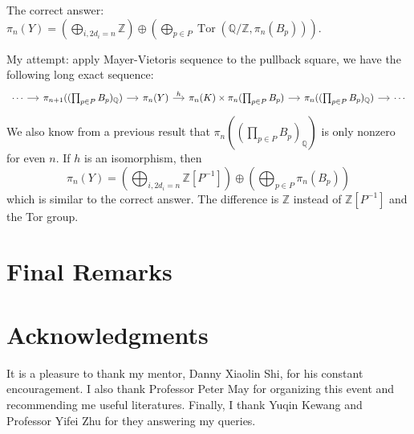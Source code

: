 \documentclass[psamsfonts]{amsart}
\theoremstyle{definition}
\newcommand{\Q}{\mathbb{Q}}
\newcommand{\Z}{\mathbb{Z}}
\DeclareMathOperator{\Tor}{Tor}
\numberwithin{equation}{section}
\begin{document}
\noindent The correct answer: $\pi_n(Y)=(\bigoplus_{i,2d_i=n}\Z)\oplus(\bigoplus_{p\in P}\Tor(\Q/\Z,\pi_n(B_p)))$.\medbreak

\noindent My attempt: apply Mayer-Vietoris sequence to the pullback square, we have the following long exact sequence:
\[\begin{tikzcd}[column sep=small]
\cdots\arrow[r]&\pi_{n+1}((\prod_{p\in P}B_p)_\Q)\arrow[r]&\pi_n(Y)\arrow[r,"h"]&\pi_n(K)\times\pi_n(\prod_{p\in P}B_p)\arrow[r]&\pi_n((\prod_{p\in P}B_p)_\Q)\arrow[r]&\cdots
\end{tikzcd}\]
We also know from a previous result that $\pi_n((\prod_{p\in P}B_p)_\Q)$ is only nonzero for even $n$. If $h$ is an isomorphism, then
\[\textstyle{\pi_n(Y)=(\bigoplus_{i,2d_i=n}\Z[P^{-1}])\oplus(\bigoplus_{p\in P}\pi_n(B_p))}\]
which is similar to the correct answer. The difference is $\Z$ instead of $\Z[P^{-1}]$ and the Tor group.


\section{Final Remarks}

\section*{Acknowledgments}

It is a pleasure to thank my mentor, Danny Xiaolin Shi, for his constant encouragement. I also thank Professor Peter May for organizing this event and recommending me useful literatures. Finally, I thank Yuqin Kewang and Professor Yifei Zhu for they answering my queries.
\end{document}
